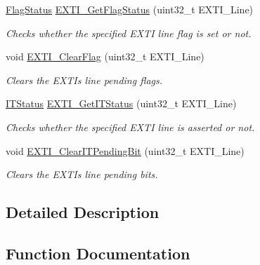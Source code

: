 \begin{DoxyCompactItemize}
\mbox{\hyperlink{group___exported__types_ga89136caac2e14c55151f527ac02daaff}{Flag\+Status}} \mbox{\hyperlink{group___e_x_t_i___private___functions_ga0ce06e6b312592df149800d63218cffa}{E\+X\+T\+I\+\_\+\+Get\+Flag\+Status}} (uint32\+\_\+t E\+X\+T\+I\+\_\+\+Line)
\begin{DoxyCompactList}\small\item\em Checks whether the specified E\+X\+TI line flag is set or not. \end{DoxyCompactList}\item 
void \mbox{\hyperlink{group___e_x_t_i___private___functions_ga8e07aaaa286dea4803605d5968850a92}{E\+X\+T\+I\+\_\+\+Clear\+Flag}} (uint32\+\_\+t E\+X\+T\+I\+\_\+\+Line)
\begin{DoxyCompactList}\small\item\em Clears the E\+X\+TI\textquotesingle{}s line pending flags. \end{DoxyCompactList}\item 
\mbox{\hyperlink{group___exported__types_gaacbd7ed539db0aacd973a0f6eca34074}{I\+T\+Status}} \mbox{\hyperlink{group___e_x_t_i___private___functions_gaf7b51519062ae42fd27ee689cab364aa}{E\+X\+T\+I\+\_\+\+Get\+I\+T\+Status}} (uint32\+\_\+t E\+X\+T\+I\+\_\+\+Line)
\begin{DoxyCompactList}\small\item\em Checks whether the specified E\+X\+TI line is asserted or not. \end{DoxyCompactList}\item 
void \mbox{\hyperlink{group___e_x_t_i___private___functions_ga3652a7e682728b310c124e7e974d1468}{E\+X\+T\+I\+\_\+\+Clear\+I\+T\+Pending\+Bit}} (uint32\+\_\+t E\+X\+T\+I\+\_\+\+Line)
\begin{DoxyCompactList}\small\item\em Clears the E\+X\+TI\textquotesingle{}s line pending bits. \end{DoxyCompactList}\end{DoxyCompactItemize}


\subsection{Detailed Description}


\subsection{Function Documentation}
\mbox{\label{group___e_x_t_i___private___functions_ga8e07aaaa286dea4803605d5968850a92}} 
